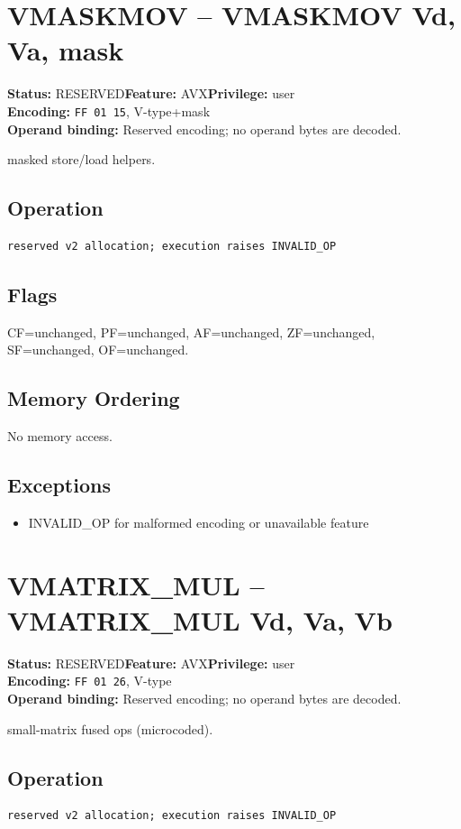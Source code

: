 \documentclass[10pt]{article}
\begin{document}
\section{VMASKMOV -- VMASKMOV Vd, Va, mask}
\textbf{Status:} RESERVED\quad \textbf{Feature:} AVX\quad \textbf{Privilege:} user\\
\textbf{Encoding:} \texttt{FF 01 15}, V-type+mask\\
\textbf{Operand binding:} Reserved encoding; no operand bytes are decoded.

masked store/load helpers.

\subsection*{Operation}
\begin{lstlisting}
reserved v2 allocation; execution raises INVALID_OP
\end{lstlisting}
\subsection*{Flags}
CF=unchanged, PF=unchanged, AF=unchanged, ZF=unchanged, SF=unchanged, OF=unchanged.
\subsection*{Memory Ordering}
No memory access.
\subsection*{Exceptions}
\begin{itemize}
\item INVALID\_OP for malformed encoding or unavailable feature
\end{itemize}
\clearpage

\section{VMATRIX\_MUL -- VMATRIX\_MUL Vd, Va, Vb}
\textbf{Status:} RESERVED\quad \textbf{Feature:} AVX\quad \textbf{Privilege:} user\\
\textbf{Encoding:} \texttt{FF 01 26}, V-type\\
\textbf{Operand binding:} Reserved encoding; no operand bytes are decoded.

small-matrix fused ops (microcoded).

\subsection*{Operation}
\begin{lstlisting}
reserved v2 allocation; execution raises INVALID_OP
\end{lstlisting}
\end{document}
